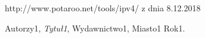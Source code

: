 \documentclass[polish,12pt,twoside,a4paper]{report}
\begin{document}




\newpage

\newpage

\begin{thebibliography}{6}

 http://www.potaroo.net/tools/ipv4/ z dnia 8.12.2018

Autorzy1, {\it Tytuł1}, Wydawnictwo1, Miasto1 Rok1.
\end{thebibliography}
\newpage


\end{document}
